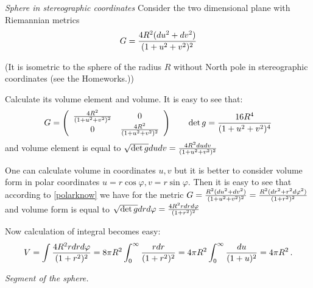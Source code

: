 \documentclass[12pt]{article}
\theoremstyle{theorem}
\numberwithin{equation}{section}
\begin{document}
\medskip


 {  \it Sphere in stereographic coordinates}
Consider the two dimensional plane with Riemannian metrics
                     \begin{equation}\label{stereographic}
    G={4R^2(du^2+dv^2)\over (1+u^2+v^2)^2}
\end{equation}

(It is isometric to the sphere of the radius $R$ without North pole in stereographic coordinates (see the Homeworks.))

   Calculate its volume element and volume.
            It is easy to see that:
                    \begin{equation}\label{}
    G=\left(
    \begin{array}{cc}
  {4R^2\over (1+u^2+v^2)^2} & 0 \\
  0&  {4R^2\over (1+u^2+v^2)^2} \\
\end{array}
\right)
\qquad
  \det g= {16R^4\over (1+u^2+v^2)^4}
\end{equation}
and volume element is equal to  $\sqrt {\det g}dudv= {4R^2dudv\over (1+u^2+v^2)^2}$

One can calculate volume in coordinates $u,v$ but it is better to
consider volume form in polar coordinates
$u=r\cos\varphi, v=r\sin\varphi$.
Then it is easy to see that according to \eqref{polarknow}
 we have for the metric $G={R^2(du^2+dv^2)\over (1+u^2+v^2)^2}={R^2(dr^2+r^2d\varphi^2)\over (1+r^2)^2}$
and volume form is equal to
$\sqrt {\det g}drd\varphi={4R^2rdr d \varphi\over (1+r^2)^2}$

Now calculation of integral becomes easy:
                  $$
    V=\int   {4R^2rdr d \varphi\over (1+r^2)^2}=8\pi R^2 \int_0^\infty {rdr\over (1+r^2)^2}=
                  4\pi  R^2 \int_0^\infty {du\over (1+u)^2}=4\pi R^2\,.
                  $$

                  \medskip
  {\it Segment of the sphere.}
\end{document}
